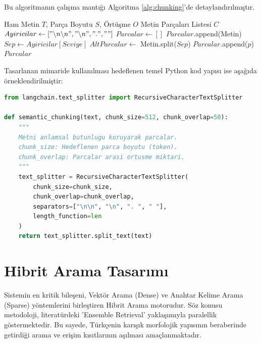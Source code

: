 \documentclass[12pt,a4paper]{report}
\begin{document}
Bu algoritmanın çalışma mantığı Algoritma \ref{alg:chunking}'de detaylandırılmıştır.

\begin{algorithm}
\caption{Rekürsif Anlamsal Parçalama Algoritması}
\label{alg:chunking}
\begin{algorithmic}[1]
\Require Ham Metin $T$, Parça Boyutu $S$, Örtüşme $O$
\Ensure Metin Parçaları Listesi $C$
\State $Ayiricilar \gets ["\backslash n\backslash n", "\backslash n", ". ", " "]$ 
\State $Parcalar \gets []$
        \State $Parcalar$.append(Metin)
        \State \Return
    \EndIf
    \State $Sep \gets Ayiricilar[Seviye]$
    \State $AltParcalar \gets$ Metin.split($Sep$)
            \State {}
        \Else
            \State $Parcalar$.append($p$)
        \EndIf
    \EndFor
\EndFunction
\State {}
\State \Return $Parcalar$
\end{algorithmic}
\end{algorithm}

Tasarlanan mimaride kullanılması hedeflenen temel Python kod yapısı ise aşağıda örneklendirilmiştir:

\begin{lstlisting}[language=Python, caption=Anlamsal Parçalama için Öngörülen Kod Yapısı]
from langchain.text_splitter import RecursiveCharacterTextSplitter

def semantic_chunking(text, chunk_size=512, chunk_overlap=50):
    """
    Metni anlamsal butunlugu koruyarak parcalar.
    chunk_size: Hedeflenen parca boyutu (token).
    chunk_overlap: Parcalar arasi ortusme miktari.
    """
    text_splitter = RecursiveCharacterTextSplitter(
        chunk_size=chunk_size,
        chunk_overlap=chunk_overlap,
        separators=["\n\n", "\n", ". ", " "],
        length_function=len
    )
    return text_splitter.split_text(text)
\end{lstlisting}

\section{Hibrit Arama Tasarımı}
Sistemin en kritik bileşeni, Vektör Arama (Dense) ve Anahtar Kelime Arama (Sparse) yöntemlerini birleştiren Hibrit Arama motorudur. Söz konusu metodoloji, literatürdeki 'Ensemble Retrieval' yaklaşımıyla paralellik göstermektedir. Bu sayede, Türkçenin karışık morfolojik yapısının beraberinde getirdiği arama ve erişim kısıtlarının aşılması amaçlanmaktadır.
\end{document}
